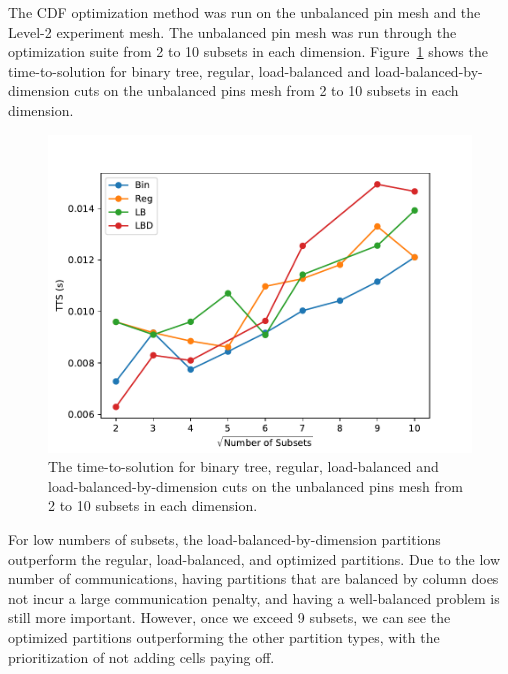The CDF optimization method was run on the unbalanced pin mesh and the Level-2 experiment mesh.
The unbalanced pin mesh was run through the optimization suite from 2 to 10 subsets in each dimension.
Figure~\ref{ubp_opt} shows the time-to-solution for binary tree, regular, load-balanced and load-balanced-by-dimension cuts on the unbalanced pins mesh from 2 to 10 subsets in each dimension.
\begin{figure}[h]
\centering
  \includegraphics{../../figures/unbalanced_pins_best_comparison.pdf}
  \caption{The time-to-solution for binary tree, regular, load-balanced and load-balanced-by-dimension cuts on the unbalanced pins mesh from 2 to 10 subsets in each dimension.}
  \label{ubp_opt}
\end{figure}
For low numbers of subsets, the load-balanced-by-dimension partitions outperform the regular, load-balanced, and optimized partitions.
Due to the low number of communications, having partitions that are balanced by column does not incur a large communication penalty, and having a well-balanced problem is still more important.
However, once we exceed 9 subsets, we can see the optimized partitions outperforming the other partition types, with the prioritization of not adding cells paying off.

